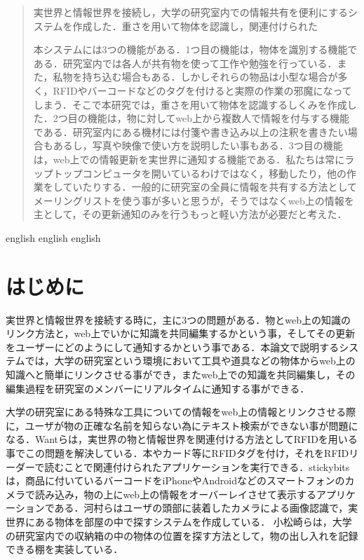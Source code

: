 
\begin{abstract}
実世界と情報世界を接続し，大学の研究室内での情報共有を便利にするシステムを作成した．重さを用いて物体を認識し，関連付けられた

本システムには3つの機能がある．1つ目の機能は，物体を識別する機能である．研究室内では各人が共有物を使って工作や勉強を行っている．また，私物を持ち込む場合もある．しかしそれらの物品は小型な場合が多く，RFIDやバーコードなどのタグを付けると実際の作業の邪魔になってしまう．そこで本研究では，重さを用いて物体を認識するしくみを作成した．2つ目の機能は，物に対してweb上から複数人で情報を付与する機能である．研究室内にある機材には付箋や書き込み以上の注釈を書きたい場合もあるし，写真や映像で使い方を説明したい事もある．3つ目の機能は，web上での情報更新を実世界に通知する機能である．私たちは常にラップトップコンピュータを開いているわけではなく，移動したり，他の作業をしていたりする．一般的に研究室の全員に情報を共有する方法としてメーリングリストを使う事が多いと思うが，そうではなくweb上の情報を主として，その更新通知のみを行うもっと軽い方法が必要だと考えた．
\end{abstract}

\begin{eabstract}
english english english
\end{eabstract}

\maketitle

\section{はじめに}\label{sec:Introduction}
実世界と情報世界を接続する時に，主に3つの問題がある．物とweb上の知識のリンク方法と，web上でいかに知識を共同編集するかという事，そしてその更新をユーザーにどのようにして通知するかという事である．本論文で説明するシステムでは，大学の研究室という環境において工具や道具などの物体からweb上の知識へと簡単にリンクさせる事ができ，またweb上での知識を共同編集し，その編集過程を研究室のメンバーにリアルタイムに通知する事ができる．

大学の研究室にある特殊な工具についての情報をweb上の情報とリンクさせる際に，ユーザが物の正確な名前を知らない為にテキスト検索ができない事が問題になる．Wantらは，実世界の物と情報世界を関連付ける方法としてRFIDを用いる事でこの問題を解決している．\cite{rfid}本やカード等にRFIDタグを付け，それをRFIDリーダーで読むことで関連付けられたアプリケーションを実行できる．stickybits\cite{stickybits}は，商品に付いているバーコードをiPhoneやAndroidなどのスマートフォンのカメラで読み込み，物の上にweb上の情報をオーバーレイさせて表示するアプリケーションである．河村らはユーザの頭部に装着したカメラによる画像認識で，実世界にある物体を部屋の中で探すシステムを作成している．\cite{head_cam} 小松崎らは，大学の研究室内での収納箱の中の物体の位置を探す方法として，物の出し入れを記録できる棚を実装している．\cite{drawer}

